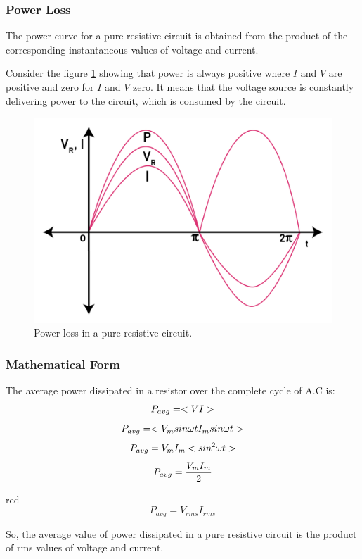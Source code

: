 \subsubsection{Power Loss}
The power curve for a pure resistive circuit is obtained from the
product of the corresponding instantaneous values of voltage and current.

Consider the figure \ref{fig:15.10} showing that power is always positive
where $I$ and $V$ are positive and zero for $I$ and $V$ zero.
It means that the voltage source is constantly delivering power
to the circuit, which is consumed by the circuit.
\begin{figure}[H]
    \centering
    \includegraphics[scale = 0.8]{Images/Chapter-15/15.10}
    \caption{Power loss in a pure resistive circuit.}
    \label{fig:15.10}
\end{figure}
\subsubsection{Mathematical Form}
The average power dissipated in a resistor over the complete cycle of A.C is:
\begin{equation}\notag
    P_{avg} = <VI>
\end{equation}
\begin{equation}\notag
    P_{avg} = <V_{m} sin \omega t I_{m} sin \omega t>
\end{equation}
\begin{equation}\notag
    P_{avg} = V_{m} I_{m}  <sin^{2} \omega t>
\end{equation}
\begin{equation}\notag
    P_{avg} = \frac{V_{m} I_{m}}{2}
\end{equation}
\begin{mybox}{red}{}
    \begin{equation}\label{eq:15.13}
        P_{avg} = V_{rms} I_{rms}
    \end{equation}
\end{mybox}
\noindent So, the average value of power dissipated in a pure resistive
circuit is the product of rms values of voltage and current.
